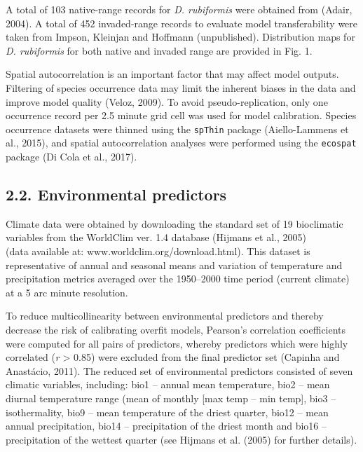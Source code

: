 \documentclass[12pt,]{article}
\begin{document}
A total of 103 native-range records for \emph{D. rubiformis} were
obtained from (Adair, 2004). A total of 452 invaded-range records to
evaluate model transferability were taken from Impson, Kleinjan and
Hoffmann (unpublished). Distribution maps for \emph{D. rubiformis} for
both native and invaded range are provided in Fig. 1.

Spatial autocorrelation is an important factor that may affect model
outputs. Filtering of species occurrence data may limit the inherent
biases in the data and improve model quality (Veloz, 2009). To avoid
pseudo-replication, only one occurrence record per 2.5 minute grid cell
was used for model calibration. Species occurrence datasets were thinned
using the \texttt{spThin} package (Aiello-Lammens et al., 2015), and
spatial autocorrelation analyses were performed using the
\texttt{ecospat} package (Di Cola et al., 2017).

\hypertarget{environmental-predictors}{%
\subsection{2.2. Environmental
predictors}\label{environmental-predictors}}

Climate data were obtained by downloading the standard set of 19
bioclimatic variables from the WorldClim ver. 1.4 database (Hijmans et
al., 2005)\\
(data available at: www.worldclim.org/download.html). This dataset is
representative of annual and seasonal means and variation of temperature
and precipitation metrics averaged over the 1950--2000 time period
(current climate) at a 5 arc minute resolution.

To reduce multicollinearity between environmental predictors and thereby
decrease the risk of calibrating overfit models, Pearson's correlation
coefficients were computed for all pairs of predictors, whereby
predictors which were highly correlated (\textbar{}\emph{r}\textbar{}
\textgreater{} 0.85) were excluded from the final predictor set (Capinha
and Anastácio, 2011). The reduced set of environmental predictors
consisted of seven climatic variables, including: bio1 -- annual mean
temperature, bio2 -- mean diurnal temperature range (mean of monthly
{[}max temp -- min temp{]}, bio3 -- isothermality, bio9 -- mean
temperature of the driest quarter, bio12 -- mean annual precipitation,
bio14 -- precipitation of the driest month and bio16 -- precipitation of
the wettest quarter (see Hijmans et al. (2005) for further details).
\end{document}

